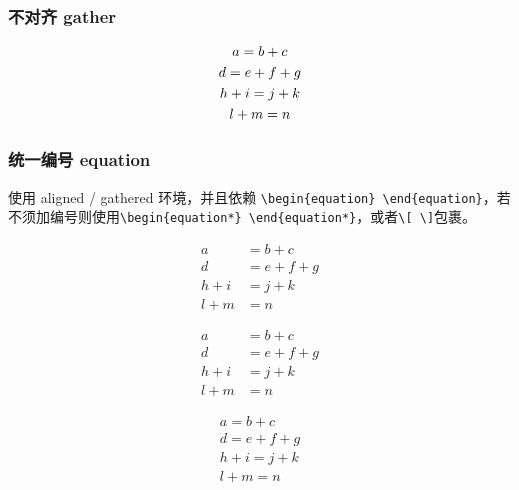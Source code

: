 \documentclass[utf-8,a4paper,11pt]{article}
\begin{document}
\subsubsection{不对齐 gather}

\begin{LTXexample}
  \begin{gather} 
    a = b + c \\ 
    d = e + f + g \\ 
    h + i = j + k \notag \\ 
    l + m = n 
  \end{gather}
\end{LTXexample}

\subsubsection{统一编号 equation}

使用 aligned / gathered 环境，并且依赖 \verb!\begin{equation} \end{equation}!，若不须加编号则使用\verb!\begin{equation*} \end{equation*}!，或者\verb!\[ \]!包裹。

\begin{LTXexample}
\begin{equation}
  \begin{aligned} 
      a &= b + c \\
      d &= e + f + g \\
      h + i &= j + k \\
      l + m &= n
  \end{aligned}
\end{equation}

\begin{equation*}
  \begin{aligned} 
      a &= b + c \\
      d &= e + f + g \\
      h + i &= j + k \\
      l + m &= n
  \end{aligned}
\end{equation*}

\[
  \begin{gathered}
      a = b + c \\
      d = e + f + g \\
      h + i = j + k \\
      l + m = n
  \end{gathered}
\]
\end{LTXexample}
\end{document}
